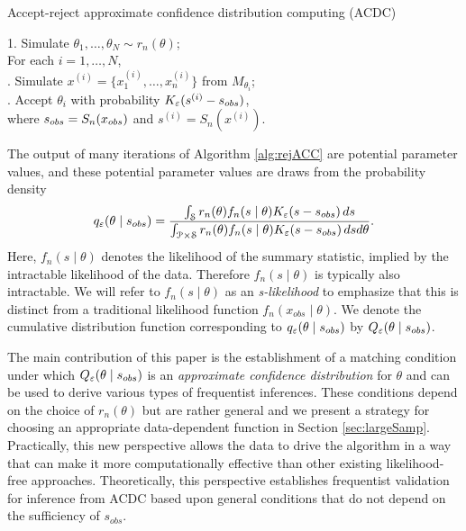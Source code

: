 \begin{algorithm}
\caption{Accept-reject approximate confidence distribution computing (ACDC)}\label{alg:rejACC} 
	\begin{tabbing}
	 1. Simulate $\theta_{1},\ldots,\theta_{N}\sim r_{n}(\theta)$; \\
	 For each $i=1,\ldots,N$, \\
	 . Simulate $x^{(i)}=\{x_{1}^{(i)},\ldots,x_{n}^{(i)}\}$ from $M_{\theta_i}$;\\ 
	 . Accept $\theta_{i}$ with probability $K_{\veps}(s^{(i)}-s_{\rm obs})$,\\ where $s_{{\rm obs}}=S_{n}(x_{\rm obs})$ and $ s^{(i)}=S_{n}(x^{(i)})$.
	\end{tabbing}
\end{algorithm}  

\vspace{-6mm}

\noindent
\hrulefill
\vspace{2mm}

The output of many iterations of Algorithm \ref{alg:rejACC} are potential parameter values, and %
these potential parameter values are draws from the probability density 
\begin{align} 
	q_{\veps}(\theta\mid s_{\rm obs})=
	\frac{\int_{ \cal S}r_{n}(\theta)f_n(s\mid\theta)K_{\veps}(s - s_{\rm obs})\,ds}{\int_{{\cal P} \times{\cal S}}r_{n}(\theta)f_n(s\mid\theta)K_{\veps}(s - s_{\rm obs})\,ds d\theta}.
\label{ACC_dist}
\end{align}
Here, $f_n (  s \mid\theta)$ denotes the likelihood of the summary statistic, implied by the intractable likelihood of the data. Therefore $f_n (  s \mid\theta)$ is typically also intractable. We will refer to $f_n ( s \mid\theta)$ as an {\it s-likelihood} to emphasize that this is distinct from a traditional likelihood function $f_n (x_{obs} \mid\theta)$. We denote the cumulative distribution function corresponding to $q_{\veps}(\theta\mid s_{\rm obs})$ by $Q_{\veps}(\theta\mid s_{\rm obs})$. 

The main contribution of this paper is the establishment of a matching condition under which $Q_{\veps}(\theta\mid s_{\rm obs})$ is
an {\it approximate confidence distribution} for $\theta$ and can be used to derive various types of frequentist inferences. These conditions depend on the choice of $r_{n}(\theta)$ but are rather general and we present a strategy for choosing an appropriate data-dependent function in Section \ref{sec:largeSamp}. %
Practically, this new perspective allows the data to drive the algorithm in a way that can make it  more computationally effective than other existing likelihood-free approaches. Theoretically, this perspective establishes frequentist validation for inference from ACDC based upon general conditions that do not depend on the sufficiency of $s_{obs}$. 

